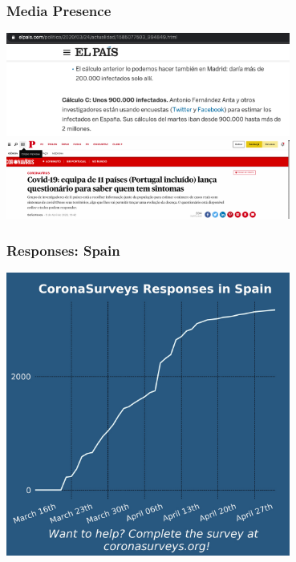 \documentclass{beamer}
\begin{document}
\begin{frame}
\frametitle{Media Presence}
\begin{center}
\includegraphics[width=0.7\textwidth]{elpais.png}
\includegraphics[width=0.7\textwidth]{publico.png}
\end{center}
\end{frame}
\begin{frame}
  \frametitle{Responses: Spain}
  \begin{center}
  \includegraphics[width=0.7\textwidth]{responses-ES.jpg}
  \end{center}
\end{frame}
\end{document}
